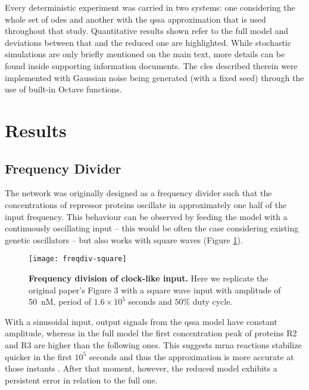   Every deterministic experiment was carried in two systems: one considering the whole set of \ac{ode}s and another with the \ac{qssa} approximation that is used throughout that study.
  Quantitative results shown refer to the full model and deviations between that and the reduced one are highlighted.
  While stochastic simulations are only briefly mentioned on the main text, more details can be found inside supporting information documents.
  The \ac{cles} described therein were implemented with Gaussian noise being generated (with a fixed seed) through the use of built-in Octave functions.


\section{Results}

  \subsection{Frequency Divider}\label{sec:freq-div}

    The network was originally designed as a frequency divider such that the concentrations of repressor proteins oscillate in approximately one half of the input frequency.
    This behaviour can be observed by feeding the model with a continuously oscillating input -- this would be often the case considering existing genetic oscillators \cite{optoscillator} -- but also works with square waves (Figure \ref{fig:freqdiv-square}).

    \begin{figure}[!htbp]
      \centering
      \texttt{[image: freqdiv-square]}
      \caption{\textbf{Frequency division of clock-like input.} Here we replicate the original paper's Figure 3 with a square wave input with amplitude of \SI{50}{\nano M}, period of $1.6 \times 10^5$ seconds and $50\%$ duty cycle.}
      \label{fig:freqdiv-square}
    \end{figure}

    With a sinusoidal input, output signals from the \ac{qssa} model have constant amplitude, whereas in the full model the first concentration peak of proteins R2 and R3 are higher than the following ones.
    This suggests \acs{mrna} reactions stabilize quicker in the first $10^5$ seconds and thus the approximation is more accurate at those instants \cite{ingalls}.
    After that moment, however, the reduced model exhibits a persistent error in relation to the full one.

